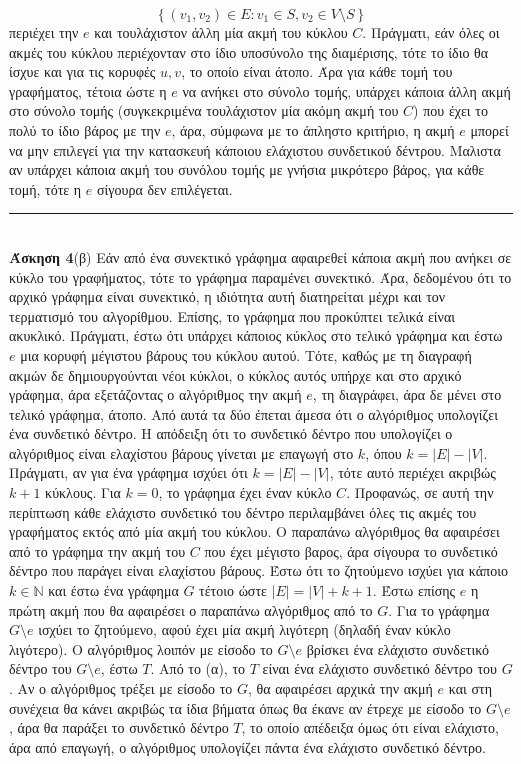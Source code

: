 \documentclass[12pt]{article}
\newcommand{\HRule}{\rule{\linewidth}{0.1mm}}
\begin{document}
$$\left\{(v_1,v_2)\in E:v_1\in S,v_2\in V\setminus S\right\}$$
περιέχει την $e$ και τουλάχιστον άλλη μία ακμή του κύκλου $C$. Πράγματι, εάν όλες οι ακμές του κύκλου περιέχονταν στο ίδιο υποσύνολο της διαμέρισης, τότε το ίδιο θα ίσχυε και για τις κορυφές $u,v$, το οποίο είναι άτοπο. Άρα για κάθε τομή του γραφήματος, τέτοια ώστε η $e$ να ανήκει στο σύνολο τομής, υπάρχει κάποια άλλη ακμή στο σύνολο τομής (συγκεκριμένα τουλάχιστον μία ακόμη ακμή του $C$) που έχει το πολύ το ίδιο βάρος με την $e$, άρα, σύμφωνα με το άπληστο κριτήριο, η ακμή $e$ μπορεί να μην επιλεγεί για την κατασκευή κάποιου ελάχιστου συνδετικού δέντρου. Μαλιστα αν υπάρχει κάποια ακμή του συνόλου τομής με γνήσια μικρότερο βάρος, για κάθε τομή, τότε η $e$ σίγουρα δεν επιλέγεται.\\
\HRule\\
{\bf Άσκηση 4}(β) Εάν από ένα συνεκτικό γράφημα αφαιρεθεί κάποια ακμή που ανήκει σε κύκλο του γραφήματος, τότε το γράφημα παραμένει συνεκτικό. Άρα, δεδομένου ότι το αρχικό γράφημα είναι συνεκτικό, η ιδιότητα αυτή διατηρείται μέχρι και τον τερματισμό του αλγορίθμου. Επίσης, το γράφημα που προκύπτει τελικά είναι ακυκλικό. Πράγματι, έστω ότι υπάρχει κάποιος κύκλος στο τελικό γράφημα και έστω $e$ μια κορυφή μέγιστου βάρους του κύκλου αυτού. Τότε, καθώς με τη διαγραφή ακμών δε δημιουργούνται νέοι κύκλοι, ο κύκλος αυτός υπήρχε και στο αρχικό γράφημα, άρα εξετάζοντας ο αλγόριθμος την ακμή $e$, τη διαγράφει, άρα δε μένει στο τελικό γράφημα, άτοπο. Από αυτά τα δύο έπεται άμεσα ότι ο αλγόριθμος υπολογίζει ένα συνδετικό δέντρο. Η απόδειξη ότι το συνδετικό δέντρο που υπολογίζει ο αλγόριθμος είναι ελαχίστου βάρους γίνεται με επαγωγή στο $k$, όπου $k=|E|-|V|$. Πράγματι, αν για ένα γράφημα ισχύει ότι $k=|E|-|V|$, τότε αυτό περιέχει ακριβώς $k+1$ κύκλους. Για $k=0$, το γράφημα έχει έναν κύκλο $C$. Προφανώς, σε αυτή την περίπτωση κάθε ελάχιστο συνδετικό του δέντρο περιλαμβάνει όλες τις ακμές του γραφήματος εκτός από μία ακμή του κύκλου. Ο παραπάνω αλγόριθμος θα αφαιρέσει από το γράφημα την ακμή του $C$ που έχει μέγιστο βαρος, άρα σίγουρα το συνδετικό δέντρο που παράγει είναι ελαχίστου βάρους. Έστω ότι το ζητούμενο ισχύει για κάποιο $k\in\mathbb{N}$ και έστω ένα γράφημα $G$ τέτοιο ώστε $|E|=|V|+k+1$. Έστω επίσης $e$ η πρώτη ακμή που θα αφαιρέσει ο παραπάνω αλγόριθμος από το $G$. Για το γράφημα $G\setminus e$ ισχύει το ζητούμενο, αφού έχει μία ακμή λιγότερη (δηλαδή έναν κύκλο λιγότερο). Ο αλγόριθμος λοιπόν με είσοδο το $G\setminus e$ βρίσκει ένα ελάχιστο συνδετικό δέντρο του $G\setminus e$, έστω $T$. Από το (α), το $T$ είναι ένα ελάχιστο συνδετικό δέντρο του $G$. Αν ο αλγόριθμος τρέξει με είσοδο το $G$, θα αφαιρέσει αρχικά την ακμή $e$ και στη συνέχεια θα κάνει ακριβώς τα ίδια βήματα όπως θα έκανε αν έτρεχε με είσοδο το $G\setminus e$, άρα θα παράξει το συνδετικό δέντρο $T$, το οποίο απέδειξα όμως ότι είναι ελάχιστο, άρα από επαγωγή, ο αλγόριθμος υπολογίζει πάντα ένα ελάχιστο συνδετικό δέντρο.\\
\end{document}
